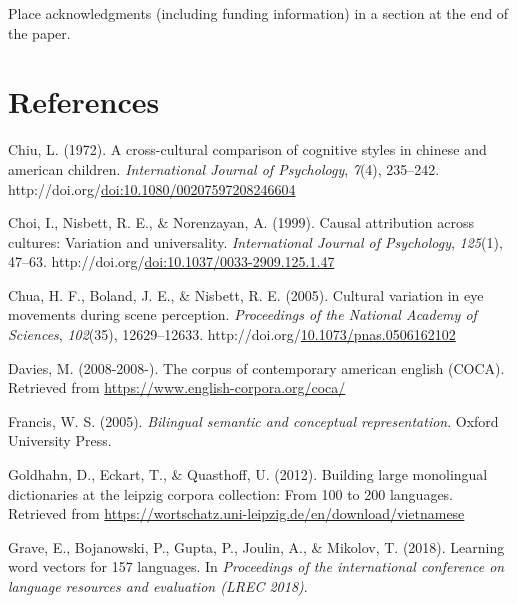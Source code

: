 \documentclass[10pt, letterpaper]{article}
\newenvironment{CSLReferences}%
  {}%
  {\par}
\begin{document}
Place acknowledgments (including funding information) in a section at
the end of the paper.

\hypertarget{references}{%
\section{References}\label{references}}

\setlength{\parindent}{-0.1in} 
\setlength{\leftskip}{0.125in}

\noindent

\hypertarget{refs}{}
\begin{CSLReferences}{1}{0}
\leavevmode{}%
Chiu, L. (1972). A cross-cultural comparison of cognitive styles in
chinese and american children. \emph{International Journal of
Psychology}, \emph{7}(4), 235--242.
http://doi.org/\href{https://doi.org/doi:10.1080/00207597208246604}{doi:10.1080/00207597208246604}

\leavevmode{}%
Choi, I., Nisbett, R. E., \& Norenzayan, A. (1999). Causal attribution
across cultures: Variation and universality. \emph{International Journal
of Psychology}, \emph{125}(1), 47--63.
http://doi.org/\href{https://doi.org/doi:10.1037/0033-2909.125.1.47}{doi:10.1037/0033-2909.125.1.47}

\leavevmode{}%
Chua, H. F., Boland, J. E., \& Nisbett, R. E. (2005). Cultural variation
in eye movements during scene perception. \emph{Proceedings of the
National Academy of Sciences}, \emph{102}(35), 12629--12633.
http://doi.org/\href{https://doi.org/10.1073/pnas.0506162102}{10.1073/pnas.0506162102}

\leavevmode{}%
Davies, M. (2008-2008-). The corpus of contemporary american english
(COCA). Retrieved from \url{https://www.english-corpora.org/coca/}

\leavevmode{}%
Francis, W. S. (2005). \emph{Bilingual semantic and conceptual
representation}. Oxford University Press.

\leavevmode{}%
Goldhahn, D., Eckart, T., \& Quasthoff, U. (2012). Building large
monolingual dictionaries at the leipzig corpora collection: From 100 to
200 languages. Retrieved from
\url{https://wortschatz.uni-leipzig.de/en/download/vietnamese}

\leavevmode{}%
Grave, E., Bojanowski, P., Gupta, P., Joulin, A., \& Mikolov, T. (2018).
Learning word vectors for 157 languages. In \emph{Proceedings of the
international conference on language resources and evaluation (LREC
2018)}.


\end{CSLReferences}
\end{document}
